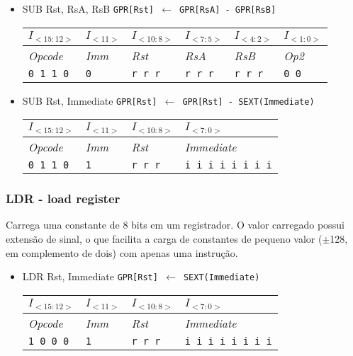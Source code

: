 \documentclass{extreport}
\begin{document}
\begin{itemize}
\item SUB Rst, RsA, RsB
\subitem \texttt{GPR[Rst] $\leftarrow$ GPR[RsA] - GPR[RsB]}
\begin{table}[ht!]
\centering
\begin{tabular}{|p{1.6cm}|p{1.6cm}|p{1.6cm}|p{1.6cm}|p{1.6cm}|p{1.6cm}|}
\hline
$I_{<15:12>}$ & $I_{<11>}$ & $I_{<10:8>}$ & $I_{<7:5>}$ & $I_{<4:2>}$ & $I_{<1:0>}$ \\ \hline
\textit{Opcode} & \textit{Imm} & \textit{Rst} & \textit{RsA} & \textit{RsB} & \textit{Op2} \\ \hline
\texttt{0 1 1 0} & \texttt{0} & \texttt{r r r} & \texttt{r r r} & \texttt{r r r} & \texttt{0 0} \\ \hline
\end{tabular}
\end{table}

\item SUB Rst, Immediate
\subitem \texttt{GPR[Rst] $\leftarrow$ GPR[Rst] - SEXT(Immediate)}
\begin{table}[ht!]
\centering
\begin{tabular}{|p{1.6cm}|p{1.6cm}|p{1.6cm}|p{5.65cm}|}
\hline
$I_{<15:12>}$ & $I_{<11>}$ & $I_{<10:8>}$ & $I_{<7:0>}$ \\ \hline
\textit{Opcode} & \textit{Imm} & \textit{Rst} & \textit{Immediate} \\ \hline
\texttt{0 1 1 0} & \texttt{1} & \texttt{r r r} & \texttt{i i i i i i i i} \\ \hline
\end{tabular}
\end{table}
\end{itemize}

\subsubsection{LDR - load register}
Carrega uma constante de 8 bits em um registrador. O valor carregado possui extensão de sinal, o que facilita a carga de constantes de pequeno valor ($\pm$128, em complemento de dois) com apenas uma instrução.

\begin{itemize}
\item LDR Rst, Immediate
\subitem \texttt{GPR[Rst] $\leftarrow$ SEXT(Immediate)}
\begin{table}[ht!]
\centering
\begin{tabular}{|p{1.6cm}|p{1.6cm}|p{1.6cm}|p{5.65cm}|}
\hline
$I_{<15:12>}$ & $I_{<11>}$ & $I_{<10:8>}$ & $I_{<7:0>}$ \\ \hline
\textit{Opcode} & \textit{Imm} & \textit{Rst} & \textit{Immediate} \\ \hline
\texttt{1 0 0 0} & \texttt{1} & \texttt{r r r} & \texttt{i i i i i i i i} \\ \hline
\end{tabular}
\end{table}
\end{itemize}
\end{document}
